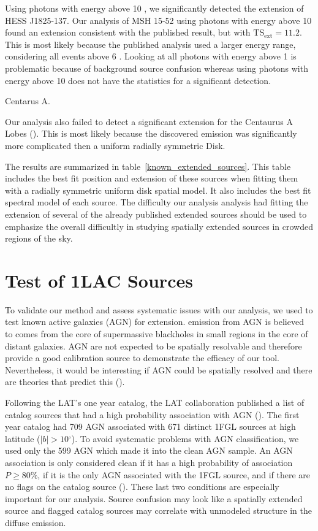 \documentclass[12pt,preprint]{aastex}
\newcommand{\gev}{\text{GeV}\xspace}
\newcommand{\tsext}{{\ensuremath{\text{TS}_\text{ext}}}\xspace}
\renewcommand{\deg}{\ensuremath{^\circ}\xspace}
\newcommand{\pointlike}{\text{\em pointlike}\xspace}
\begin{document}
Using photons with energy above 10 \gev, we significantly detected
the extension of HESS J1825-137.
Our analysis of MSH 15-52 using photons with energy above 10 \gev found an extension
consistent with the published result, but with $\tsext=11.2$. This is
most likely because the published analysis used a larger energy range,
considering all events above 6 \gev. Looking at all photons with
energy above 1 \gev 
is problematic because of background source confusion whereas using photons
with energy above 10 \gev does not have the statistics for a significant detection.



Centarus A.

Our analysis also failed to detect a significant extension for the
Centaurus A Lobes (\cite{cen_a_lat}). This is most likely because the
discovered emission was significantly more complicated then a uniform
radially symmetric Disk.  

The results are summarized in table~\ref{known_extended_sources}.
This table includes the best fit position and extension of these
sources when fitting them with a radially symmetric uniform disk spatial
model.  It also includes the best fit spectral model of each source.
The difficulty our analysis analysis had fitting the extension of several
of the already published extended sources should be used to emphasize
the overall difficultly in studying spatially extended sources in crowded
regions of the sky.

\section{Test of 1LAC Sources}
\label{test_1lac_sources}

To validate our method and assess systematic issues with our analysis,
we used \pointlike to test known active galaxies (AGN) for extension.
\gev emission from AGN is believed to comes from the core of supermassive
blackholes in small regions in the core of distant galaxies.  AGN are
not expected to be spatially resolvable and therefore provide a good
calibration source to demonstrate the efficacy of our tool. Nevertheless,
it would be interesting if AGN could be spatially resolved and
there are theories that predict this (\cite{pair_halo_paper}).

Following the LAT's one year catalog, the LAT collaboration published
a list of catalog sources that had a high probability association with
AGN (\cite{first_agn_cat}).
The first year catalog had 709 AGN associated with 671 distinct
1FGL sources at high latitude ($|b|>10\deg$).  To avoid systematic
problems with AGN classification, we used only the 599 AGN which made
it into the clean AGN sample.  An AGN association is only considered
clean if it has a high probability of association $P\ge 80\%$, if it is
the only AGN associated with the 1FGL source, and if there are no flags
on the catalog source (\cite{first_cat}). These last two conditions are
especially important for our analysis.  Source confusion may look like
a spatially extended source and flagged catalog sources may correlate
with unmodeled structure in the diffuse emission.
\end{document}
